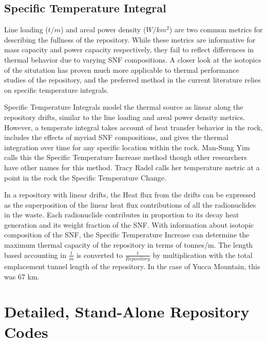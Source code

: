 \subsection{Specific Temperature Integral}

Line loading ($t/m$) and areal power density ($W/km^2$) are two common 
metrics for describing the fullness of the repository. While these 
metrics are informative for mass capacity and power capacity 
respectively, they fail to reflect differences in thermal behavior due 
to varying SNF compositions.  A closer look at the isotopics of the 
situtation has proven much more applicable to thermal performance 
studies of the repository, and the preferred method in the current 
literature relies on specific temperature integrals.


Specific Temperature Integrals model the thermal source as linear 
along the repository drifts, similar to the line loading and areal 
power density metrics. However, a temperate integral takes account of 
heat transfer behavior in the rock, includes the effects of myriad SNF 
compositions, and gives the thermal integration over time for any 
specific location within the rock.  Man-Sung Yim calls this the 
Specific Temperature Increase method\cite{li_specific_2008} though other 
researchers have other names for this method. Tracy Radel calls her 
temperature metric at a point in the rock the Specific Temperature 
Change.\cite{radel_repository_2007}

In a repository with linear drifts, the Heat flux from the drifts can 
be expressed as the superposition of the linear heat flux 
contributions of all the radionuclides in the waste. Each radionuclide 
contributes in proportion to its decay heat generation and its weight 
fraction of the SNF. With information about isotopic composition of 
the SNF, the Specific Temperature Increase can determine the maximum 
thermal capacity of the repository in terms of tonnes/m. The length 
based accounting in $\frac{t}{m}$ is converted to 
$\frac{t}{Repository}$ by multiplication with the total emplacement 
tunnel length of the repository.  In the case of Yucca Mountain, this 
was 67 km.



\section{Detailed, Stand-Alone Repository 
Codes}\label{sec:detailed_codes}

